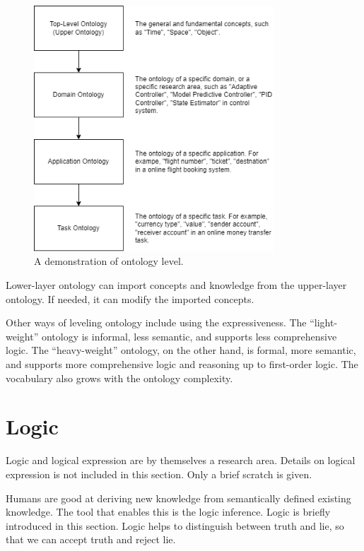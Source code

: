 \begin{figure}[htbp]
	\centering
	\includegraphics[width=0.8\textwidth]{./chapters/ch-semanticwebarchitecture/figures/ontologylevel.png}
	\caption{A demonstration of ontology level.}
	\label{fig:ontologylevel}
\end{figure}

Lower-layer ontology can import concepts and knowledge from the upper-layer ontology. If needed, it can modify the imported concepts.

Other ways of leveling ontology include using the expressiveness. The ``light-weight'' ontology is informal, less semantic, and supports less comprehensive logic. The ``heavy-weight'' ontology, on the other hand, is formal, more semantic, and supports more comprehensive logic and reasoning up to first-order logic. The vocabulary also grows with the ontology complexity.

\section{Logic} \label{sec:logic}

Logic and logical expression are by themselves a research area. Details on logical expression is not included in this section. Only a brief scratch is given.

Humans are good at deriving new knowledge from semantically defined existing knowledge. The tool that enables this is the logic inference. Logic is briefly introduced in this section. Logic helps to distinguish between truth and lie, so that we can accept truth and reject lie.

